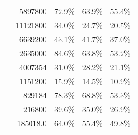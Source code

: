 \begin{table}[!tbp]
\begin{tabular}{lrrrr}
\eeTo{ \Pquark \Pquark} &  5897800 & 72.9\%& 63.9\%& 55.4\%\\
\eeTo{ \Pquark \Pquark \Plepton \Pnu} &  11121800 & 34.0\%& 24.7\%& 20.5\%\\
\eeTo{ \Pquark \Pquark \Pl \Pl} &  6639200 & 43.1\%& 41.7\%& 37.0\%\\
\eeTo{ \Pquark \Pquark \Pnu \Pnu} & 2635000 &84.6\%& 63.8\%& 53.2\% \\
\hline
\egamma{\Pepm}{\Pphoton}{\BS}{\Pepm \Pquark \Pquark \Pquark \Pquark} & 4007354  & 31.0\%& 28.2\%& 21.1\%\\
\egamma{\Pepm}{\Pphoton}{\EPA}{\Pepm \Pquark \Pquark \Pquark \Pquark} & 1151200& 15.9\%& 14.5\%& 10.9\%\\
\egamma{\Pepm}{\Pphoton}{\BS}{\Pnu \Pquark \Pquark \Pquark \Pquark}& 829184  & 78.3\%& 68.8\%& 53.3\%\\
\egamma{\Pepm}{\Pphoton}{\EPA}{\Pnu \Pquark \Pquark \Pquark \Pquark}& 216800  & 39.6\% & 35.0\%& 26.9\%\\
\egamma{\Pepm}{\Pphoton}{\BS}{\Pquark \Pquark \PHiggs \Pnu} & 185018.0  & 64.0\% &55.4\%& 49.8\% \\

\end{tabular}
\end{table}
